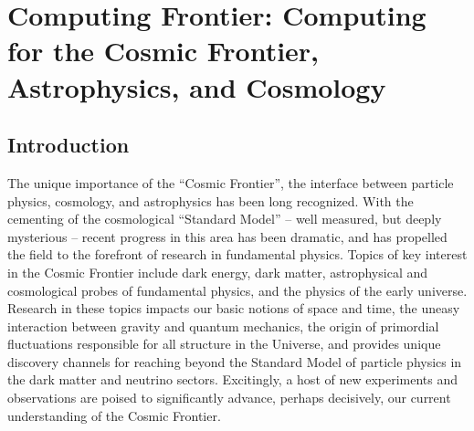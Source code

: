  
\chapter{Computing Frontier: Computing for the Cosmic Frontier, Astrophysics, and Cosmology}
\label{chap:mag}


\begin{center}\begin{boldmath}



\end{boldmath}\end{center}


\section{Introduction}
\label{sec:comp-intro}

The unique importance of the ``Cosmic Frontier'', the interface
between particle physics, cosmology, and astrophysics has been long
recognized. With the cementing of the cosmological ``Standard Model''
-- well measured, but deeply mysterious -- recent progress in this
area has been dramatic, and has propelled the field to the forefront
of research in fundamental physics. Topics of key interest in the
Cosmic Frontier include dark energy, dark matter, astrophysical and
cosmological probes of fundamental physics, and the physics of the
early universe. Research in these topics impacts our basic notions of
space and time, the uneasy interaction between gravity and quantum
mechanics, the origin of primordial fluctuations responsible for all
structure in the Universe, and provides unique discovery channels for
reaching beyond the Standard Model of particle physics in the dark
matter and neutrino sectors. Excitingly, a host of new experiments and
observations are poised to significantly advance, perhaps decisively,
our current understanding of the Cosmic Frontier.

